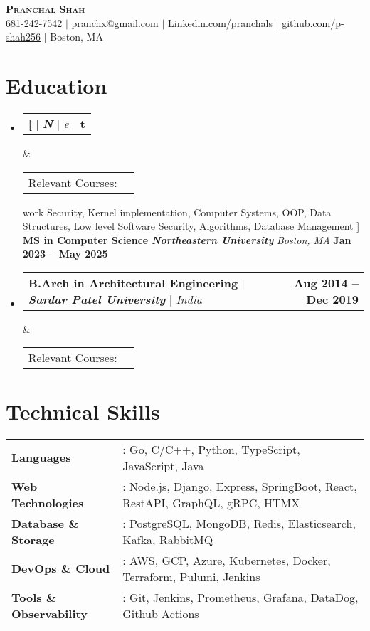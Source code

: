 \documentclass[letterpaper,11pt]{article}
\makeatletter
\newcommand{\preSecSpace}{-10pt}
\newcommand{\postItemSpace}{-10pt}
\newcommand{\preItemSpace}{-10pt}
\newcommand{\preSecVSpace}{\vspace{\preSecSpace}}
\newcommand{\postItemVSpace}{\vspace{\postItemSpace}}
\newcommand{\eduItem}[5][]{
    \item
    \begin{tabular*}{\textwidth}
        {p{5.7in}@{\extracolsep{\fill}}r}
        \textbf{#2} $|$ \textbf{\textit{#3}} $|$ \textit{#4} & \textbf{#5} \\
    \end{tabular*}
        \ifx#1&%
        \else
            \begin{tabular*}{\textwidth}
                {l@{}p{4.5in}}
                \small{Relevant Courses: } & {\small #1} \\
            \end{tabular*}
        \fi
    \postItemVSpace
}
\newcommand{\sectionStart}{
    \begin{itemize}[
        leftmargin=0pt,
        label={},
        topsep=\preItemSpace,    %
        itemsep=2pt,   %
    ]
}
\newcommand{\sectionEnd}{
    \end{itemize}
}
\makeatother
\begin{document}
\begin{center}
    \textbf{\Huge \scshape Pranchal Shah} \\
    \vspace{1pt}
    \small 681-242-7542 $|$
    \href{mailto:pranchx@gmail.com}{\small\underline{pranchx@gmail.com}} $|$
    \href{https://linkedin.com/in/pranchals}{\small\underline{Linkedin.com/pranchals}} $|$
    \href{https://github.com/p-shah256}{\small\underline{github.com/p-shah256}} $|$
    \small Boston, MA
    \vspace{1pt}
\end{center}

\section{Education}
\sectionStart
    \eduItem
        [Network Security, Kernel implementation, Computer Systems, OOP, Data Structures, Low level Software Security, Algorithms, Database Management ]
        {\textbf {MS in Computer Science}}
        {\textbf{\textit{Northeastern University}}}
        {\textit{Boston, MA}}
        {\textbf{Jan 2023 -- May 2025}}
    \eduItem
        {\textbf{B.Arch in Architectural Engineering}}
        {\textbf{\textit{Sardar Patel University}}}
        {\textit{India}}
        {\textbf{Aug 2014 -- Dec 2019}}
\sectionEnd

\section{Technical Skills}
\begin{tabular*}{\textwidth}{l@{\hspace{10pt}}l}
    \textbf{\small Languages} & \small : Go, C/C++, Python, TypeScript, JavaScript, Java \\
    \textbf{\small Web Technologies} & \small : Node.js, Django, Express, SpringBoot, React, RestAPI, GraphQL, gRPC, HTMX \\
    \textbf{\small Database \& Storage} & \small : PostgreSQL, MongoDB, Redis, Elasticsearch, Kafka, RabbitMQ \\
    \textbf{\small DevOps \& Cloud} & \small : AWS, GCP, Azure, Kubernetes, Docker, Terraform, Pulumi, Jenkins \\
    \textbf{\small Tools \& Observability} & \small : Git, Jenkins, Prometheus, Grafana, DataDog, Github Actions \\
\end{tabular*}
\end{document}
